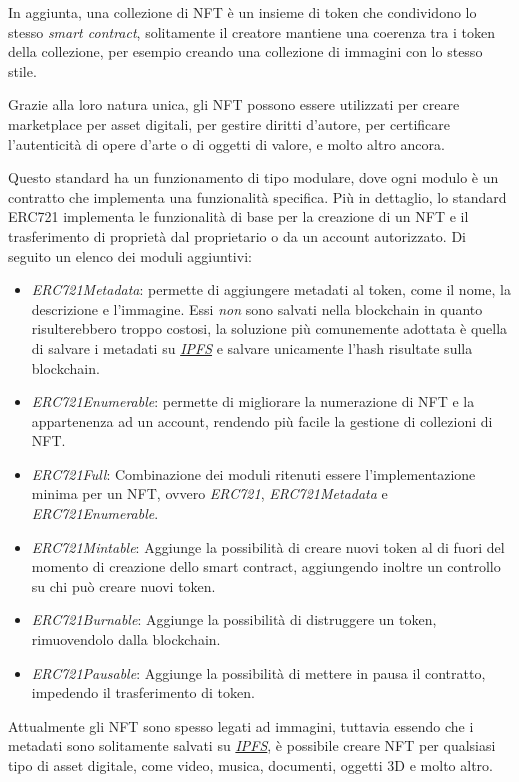 In aggiunta, una collezione di NFT è un insieme di token che condividono lo stesso \textit{smart contract}, solitamente il creatore mantiene una coerenza tra i token della collezione, per esempio creando una collezione di immagini con lo stesso stile.

Grazie alla loro natura unica, gli NFT possono essere utilizzati per creare marketplace per asset digitali, per gestire diritti d'autore, per certificare l'autenticità di opere d'arte o di oggetti di valore, e molto altro ancora.

Questo standard ha un funzionamento di tipo modulare, dove ogni modulo è un contratto che implementa una funzionalità specifica. Più in dettaglio, lo standard ERC721 implementa le funzionalità di base per la creazione di un NFT e il trasferimento di proprietà dal proprietario o da un account autorizzato. Di seguito un elenco dei moduli aggiuntivi:

\begin{itemize}
    \item \textit{ERC721Metadata}: permette di aggiungere metadati al token, come il nome, la descrizione e l'immagine. Essi \textit{non} sono salvati nella blockchain in quanto risulterebbero troppo costosi, la soluzione più comunemente adottata è quella di salvare i metadati su \hyperref[sec:ipfs]{\textit{IPFS}} e salvare unicamente l'hash risultate sulla blockchain.
    \item \textit{ERC721Enumerable}: permette di migliorare la numerazione di NFT e la appartenenza ad un account, rendendo più facile la gestione di collezioni di NFT.
    \item \textit{ERC721Full}: Combinazione dei moduli ritenuti essere l'implementazione minima per un NFT, ovvero \textit{ERC721}, \textit{ERC721Metadata} e \textit{ERC721Enumerable}.
    \item \textit{ERC721Mintable}: Aggiunge la possibilità di creare nuovi token al di fuori del momento di creazione dello smart contract, aggiungendo inoltre un controllo su chi può creare nuovi token.
    \item \textit{ERC721Burnable}: Aggiunge la possibilità di distruggere un token, rimuovendolo dalla blockchain.
    \item \textit{ERC721Pausable}: Aggiunge la possibilità di mettere in pausa il contratto, impedendo il trasferimento di token.
\end{itemize}

Attualmente gli NFT sono spesso legati ad immagini, tuttavia essendo che i metadati sono solitamente salvati su \hyperref[sec:ipfs]{\textit{IPFS}}, è possibile creare NFT per qualsiasi tipo di asset digitale, come video, musica, documenti, oggetti 3D e molto altro. \cite{erc721}


